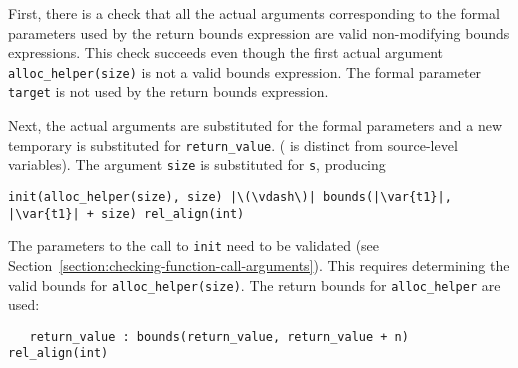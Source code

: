 First, there is a check that all the actual arguments corresponding to
the formal parameters used by the return bounds expression are valid
non-modifying bounds expressions. This check succeeds even though the
first actual argument \lstinline|alloc_helper(size)| is not a valid bounds
expression. The formal parameter \lstinline|target| is not used by the
return bounds expression.

Next, the actual arguments are substituted for the formal parameters and
a new temporary  is substituted for \lstinline|return_value|.
( is distinct from source-level variables).
The argument \lstinline|size| is substituted for \lstinline|s|, producing
\begin{lstlisting}[escapechar=\|]
    init(alloc_helper(size), size) |\(\vdash\)| bounds(|\var{t1}|, |\var{t1}| + size) rel_align(int)
\end{lstlisting}

%
%
%
%

The parameters to the call to \lstinline|init| need to be validated
(see Section~\ref{section:checking-function-call-arguments}). This
requires determining the valid bounds for \lstinline|alloc_helper(size)|. The
return bounds for \lstinline|alloc_helper| are used:
\begin{lstlisting}
   return_value : bounds(return_value, return_value + n) rel_align(int)
\end{lstlisting}

